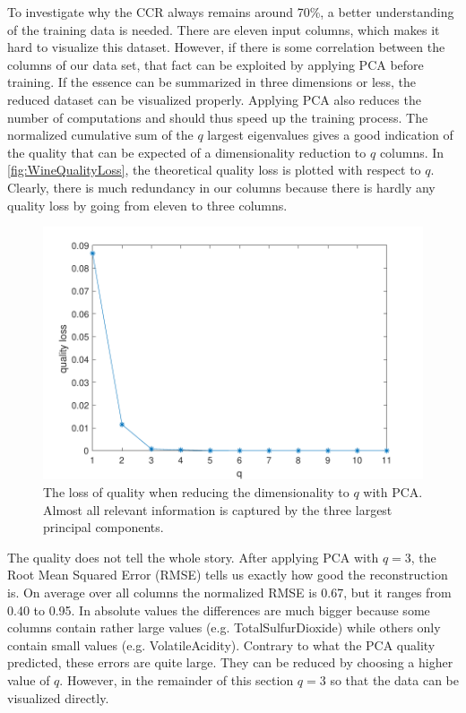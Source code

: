 \documentclass[a4, 10pt, twoside, twocolumn]{article}
\numberwithin{figure}{section}
\begin{document}
To investigate why the CCR always remains around 70\%, a better understanding of the training data is needed. There are eleven input columns, which makes it hard to visualize this dataset. However, if there is some correlation between the columns of our data set, that fact can be exploited by applying PCA before training. If the essence can be summarized in three dimensions or less, the reduced dataset can be visualized properly. Applying PCA also reduces the number of computations and should thus speed up the training process. The normalized cumulative sum of the $q$ largest eigenvalues gives a good indication of the quality that can be expected of a dimensionality reduction to $q$ columns. In \autoref{fig:WineQualityLoss}, the theoretical quality loss is plotted with respect to $q$. Clearly, there is much redundancy in our columns because there is hardly any quality loss by going from eleven to three columns.

\begin{figure}[ht]
    \includegraphics[width=\linewidth]{img/WineQualityLoss.pdf}
    \caption{The loss of quality when reducing the dimensionality to $q$ with PCA. Almost all relevant information is captured by the three largest principal components.}
    \label{fig:WineQualityLoss}
\end{figure}

The quality does not tell the whole story. After applying PCA with $q=3$, the Root Mean Squared Error (RMSE) tells us exactly how good the reconstruction is. On average over all columns the normalized RMSE is 0.67, but it ranges from 0.40 to 0.95. In absolute values the differences are much bigger because some columns contain rather large values (e.g. TotalSulfurDioxide) while others only contain small values (e.g. VolatileAcidity). Contrary to what the PCA quality predicted, these errors are quite large. They can be reduced by choosing a higher value of $q$. However, in the remainder of this section $q=3$ so that the data can be visualized directly.
\end{document}
